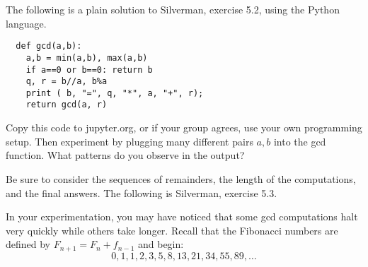 \documentclass[12pt]{exam}
\begin{document}
\begin{questions}
  \question The following is a plain solution to Silverman, exercise 5.2, using the Python language.
  \begin{lstlisting}
  def gcd(a,b):
    a,b = min(a,b), max(a,b)
    if a==0 or b==0: return b
    q, r = b//a, b%a
    print ( b, "=", q, "*", a, "+", r);
    return gcd(a, r)
  \end{lstlisting}
  Copy this code to jupyter.org, or if your group agrees, use your own programming setup. Then experiment by plugging many different pairs $a,b$ into the gcd function. What patterns do you observe in the output?
  
  Be sure to consider the sequences of remainders, the length of the computations, and the final answers.
  \newpage
  \question The following is Silverman, exercise 5.3.
  \newpage
  \question In your experimentation, you may have noticed that some gcd computations halt very quickly while others take longer. Recall that the Fibonacci numbers are defined by $F_{n+1}=F_n+f_{n-1}$ and begin:
  \[0,1,1,2,3,5,8,13,21,34,55,89,\ldots
  \]
\end{questions}
\end{document}
